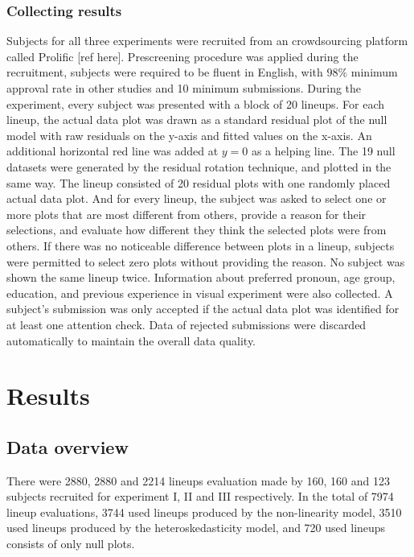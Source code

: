 \documentclass[]{interact}
\theoremstyle{plain}%
\theoremstyle{definition}
\theoremstyle{remark}
\begin{document}
\hypertarget{collecting-results}{%
\subsubsection{Collecting results}\label{collecting-results}}

Subjects for all three experiments were recruited from an crowdsourcing
platform called Prolific {[}ref here{]}. Prescreening procedure was
applied during the recruitment, subjects were required to be fluent in
English, with \(98\%\) minimum approval rate in other studies and 10
minimum submissions. During the experiment, every subject was presented
with a block of 20 lineups. For each lineup, the actual data plot was
drawn as a standard residual plot of the null model with raw residuals
on the y-axis and fitted values on the x-axis. An additional horizontal
red line was added at \(y = 0\) as a helping line. The 19 null datasets
were generated by the residual rotation technique, and plotted in the
same way. The lineup consisted of 20 residual plots with one randomly
placed actual data plot. And for every lineup, the subject was asked to
select one or more plots that are most different from others, provide a
reason for their selections, and evaluate how different they think the
selected plots were from others. If there was no noticeable difference
between plots in a lineup, subjects were permitted to select zero plots
without providing the reason. No subject was shown the same lineup
twice. Information about preferred pronoun, age group, education, and
previous experience in visual experiment were also collected. A
subject's submission was only accepted if the actual data plot was
identified for at least one attention check. Data of rejected
submissions were discarded automatically to maintain the overall data
quality.

\hypertarget{results}{%
\section{Results}\label{results}}

\hypertarget{data-overview}{%
\subsection{Data overview}\label{data-overview}}

There were 2880, 2880 and 2214 lineups evaluation made by 160, 160 and
123 subjects recruited for experiment I, II and III respectively. In the
total of 7974 lineup evaluations, 3744 used lineups produced by the
non-linearity model, 3510 used lineups produced by the
heteroskedasticity model, and 720 used lineups consists of only null
plots.
\end{document}
